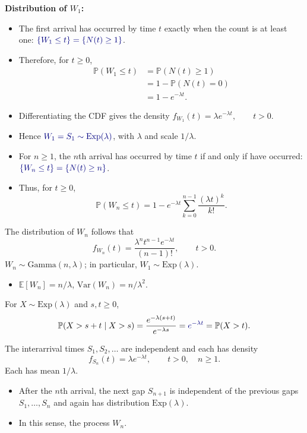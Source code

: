 \documentclass[8pt,a4paper,landscape]{extarticle}
\begin{document}
\begin{cscolumns}
\columnbreak
\noindent\textbf{Distribution of $W_1$:}
\begin{itemize}
\item The first arrival has occurred by time $t$ exactly when the count is at least one: ${\color{csBlue}\{W_1\le t\}=\{N(t)\ge1\}}$.
\item Therefore, for $t\ge0$,
\begin{align*}
\mathbb{P}(W_1\le t)
&= \mathbb{P}(N(t)\ge1)\\
&= 1-\mathbb{P}(N(t)=0)\\
&= 1-e^{-\lambda t}.
\end{align*}
\item Differentiating the CDF gives the density $f_{W_1}(t)=\lambda e^{-\lambda t},\qquad t>0.$
\item Hence ${\color{csBlue}W_1=S_1\sim\mathrm{Exp}(\lambda)}$, with  $\lambda$ and scale $1/\lambda$.
\end{itemize}

\begin{itemize}
\item For $n\ge1$, the $n$th arrival has occurred by time $t$ if and only if  have occurred: ${\color{csBlue}\{W_n\le t\}=\{N(t)\ge n\}}$.
\item Thus, for $t\ge0$,
\[ \mathbb{P}(W_n\le t)=1-e^{-\lambda t}\sum_{k=0}^{n-1}\frac{(\lambda t)^k}{k!}. \]
\end{itemize}

\begin{theorem}
The distribution of $W_n$ follows that
\[ f_{W_n}(t)=\frac{\lambda^n t^{n-1}e^{-\lambda t}}{(n-1)!},\qquad t>0. \]
$W_n\sim\mathrm{Gamma}(n,\lambda)$; in particular, $W_1\sim\mathrm{Exp}(\lambda)$.
\end{theorem}
\begin{itemize}
\item $\mathbb{E}[W_n]=n/\lambda$, $\mathrm{Var}(W_n)=n/\lambda^2$.
\end{itemize}

\begin{theorem}
For $X\sim\mathrm{Exp}(\lambda)$ and $s,t\ge0$,
\[ \mathbb{P}(X>s+t\mid X>s)=\frac{e^{-\lambda(s+t)}}{e^{-\lambda s}}={\color{csBlue}e^{-\lambda t}}=\mathbb{P}(X>t). \]
\end{theorem}

\begin{theorem}
The interarrival times $S_1,S_2,\ldots$ are independent and each has density
\[ f_{S_n}(t)=\lambda e^{-\lambda t},\qquad t>0,\quad n\ge1. \]
Each has mean $1/\lambda$.
\end{theorem}
\begin{itemize}
\item After the $n$th arrival, the next gap $S_{n+1}$ is independent of the previous gaps $S_1,\ldots,S_n$ and again has distribution $\mathrm{Exp}(\lambda)$.
\item In this sense, the process  $W_n$.
\end{itemize}


\end{cscolumns}
\end{document}
